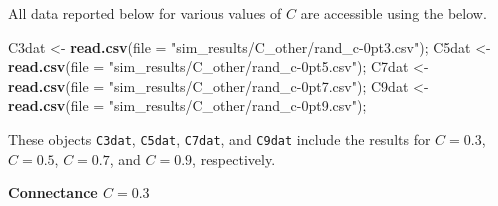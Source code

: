 \documentclass[]{article}
\newenvironment{Shaded}{\begin{snugshade}}{\end{snugshade}}
\newcommand{\KeywordTok}[1]{\textcolor[rgb]{0.13,0.29,0.53}{\textbf{{#1}}}}
\newcommand{\DataTypeTok}[1]{\textcolor[rgb]{0.13,0.29,0.53}{{#1}}}
\newcommand{\StringTok}[1]{\textcolor[rgb]{0.31,0.60,0.02}{{#1}}}
\newcommand{\NormalTok}[1]{{#1}}
\begin{document}
All data reported below for various values of \(C\) are accessible using
the below.

\begin{Shaded}
\begin{Highlighting}[]
\NormalTok{C3dat <-}\StringTok{ }\KeywordTok{read.csv}\NormalTok{(}\DataTypeTok{file =} \StringTok{"sim_results/C_other/rand_c-0pt3.csv"}\NormalTok{);}
\NormalTok{C5dat <-}\StringTok{ }\KeywordTok{read.csv}\NormalTok{(}\DataTypeTok{file =} \StringTok{"sim_results/C_other/rand_c-0pt5.csv"}\NormalTok{);}
\NormalTok{C7dat <-}\StringTok{ }\KeywordTok{read.csv}\NormalTok{(}\DataTypeTok{file =} \StringTok{"sim_results/C_other/rand_c-0pt7.csv"}\NormalTok{);}
\NormalTok{C9dat <-}\StringTok{ }\KeywordTok{read.csv}\NormalTok{(}\DataTypeTok{file =} \StringTok{"sim_results/C_other/rand_c-0pt9.csv"}\NormalTok{);}
\end{Highlighting}
\end{Shaded}

These objects \texttt{C3dat}, \texttt{C5dat}, \texttt{C7dat}, and
\texttt{C9dat} include the results for \(C = 0.3\), \(C = 0.5\),
\(C = 0.7\), and \(C = 0.9\), respectively.

\textbf{Connectance \(C = 0.3\)}
\end{document}
